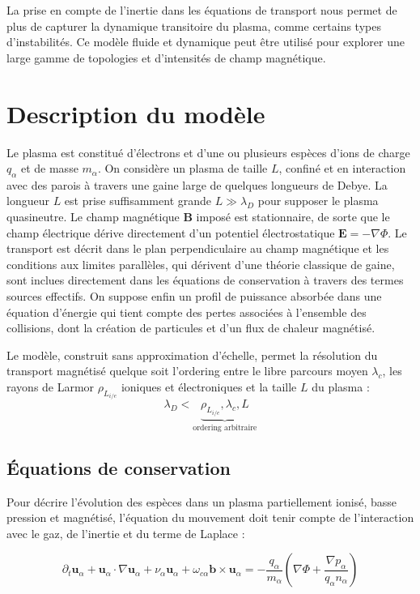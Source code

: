 \begin{refsection}
  La prise en compte de l'inertie
	dans les équations de transport nous permet de plus de capturer la dynamique transitoire du plasma, comme certains types d'instabilités. Ce modèle fluide et dynamique peut être utilisé pour explorer
		une large gamme de topologies et d'intensités de champ magnétique.

\section{Description du modèle}
Le plasma est constitué d'électrons et d'une ou plusieurs espèces d'ions de
charge $q_\alpha$ et de masse $m_\alpha$. On considère un plasma de taille $L$,
confiné et en interaction avec des parois à travers une gaine large de quelques longueurs
de Debye. La longueur $L$ est prise suffisamment grande $L\gg\lambda_D$ pour
supposer le plasma quasineutre. Le champ magnétique $\mathbf{B}$ imposé est 
stationnaire, de sorte que le champ électrique dérive directement d'un 
potentiel électrostatique $\mathbf{E}=-\nabla \Phi$. Le transport est décrit
dans le plan perpendiculaire au champ magnétique et les conditions aux limites
parallèles, qui dérivent d'une théorie classique de gaine, sont
inclues directement dans les équations de conservation à travers des termes
sources effectifs. On suppose enfin un profil de puissance absorbée dans une
équation d'énergie qui tient compte des pertes associées à l'ensemble des
collisions, dont la création de particules et d'un flux de chaleur magnétisé.

Le modèle, construit sans approximation d'échelle, permet la résolution du
transport magnétisé quelque soit l'ordering entre le libre parcours moyen
$\lambda_c$, les rayons de Larmor $\rho_{L_{i/e}}$ ioniques et électroniques et
la taille $L$ du plasma :
\begin{equation*}
\lambda_D<\underbrace{\rho_{L_{i/e}},\lambda_c,L}_\text{ordering arbitraire}
\end{equation*}

\subsection{Équations de conservation}
Pour décrire l'évolution des espèces dans un plasma partiellement ionisé, basse
pression et magnétisé, l'équation du mouvement doit tenir compte de
l'interaction avec le gaz, de l'inertie et du terme de Laplace :

\begin{equation}
\label{3-eqMouvement}
\partial_t \mathbf{u}_\alpha + \mathbf{u}_\alpha\cdot\nabla\mathbf{u}_\alpha+
\nu_\alpha\mathbf{u}_\alpha+\omega_{c\alpha}\mathbf{b}\times\mathbf{u}_\alpha=
-\frac{q_\alpha}{m_\alpha}\left(\nabla \Phi+\frac{\nabla
p_\alpha}{q_\alpha n_\alpha}\right)
\end{equation}


\end{refsection}

